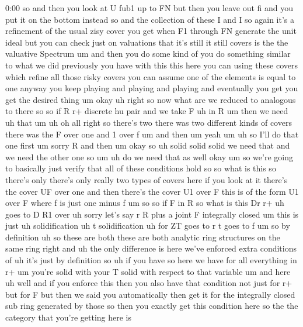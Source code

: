 \begin{unfinished}{0:00}
so  and  then  you  look  at  U  fub1  up  to  FN
but  then  you  leave  out  fi  and  you  put  it
on  the  bottom  instead  so  and  the
collection  of
these  I  and  I  so  again  it's  a  refinement
of  the  usual  zisy  cover  you  get  when  F1
through  FN  generate  the  unit  ideal  but
you  can  check  just  on  valuations  that
it's  still  it  still  covers  is  the  the
valuative  Spectrum  um  and  then  you  do
some  kind  of  you  do  something  similar  to
what  we  did  previously  you  have  with
this  this  here  you  can  using  these
covers  which  refine  all  those  risky
covers  you  can  assume  one  of  the
elements  is  equal  to  one  anyway  you  keep
playing  and  playing  and  playing  and
eventually  you  get  you  get  the  desired
thing  um
okay  uh  right  so  now  what  are  we  reduced
to  analogous  to  there
so  so  if  R  r+  discrete  hu
pair  and  we  take  F  uh  in
R  um  then  we  need  uh
that
um
uh
oh  all  right  so  there's  two  there  was
two  different  kinds  of  covers  there  was
the  F  over  one  and  1  over  f  um  and  then
um
yeah  um
uh  so  I'll  do  that  one
first  um  sorry  R  and
then
um  okay  so  uh  solid  solid
solid  we  need  that  and  we  need  the  other
one
so
um
uh  do  we  need  that  as
well
okay  um  so  we're  going  to  basically  just
verify  that  all  of  these  conditions  hold
so
so  what  is  this  so  there's  only  there's
only  really  two  types  of  covers  here  if
you  look  at  it  there's  the  cover  UF  over
one  and  then  there's  the  cover  U1  over  F
this  is  of  the  form  U1  over  F  where  f  is
just  one  minus  f  um  so  so  if  F  in
R  so  what  is  this  Dr
r+  uh  goes  to  D  R1  over  uh  sorry  let's
say  r  R  plus  a  joint  F  integrally
closed  um  this  is
just  uh
solidification  uh  t
solidification  uh  for  ZT  goes  to  r  t
goes  to
f
um  so  by
definition  uh  so  these  are  both  these
are  both  analytic  ring  structures  on  the
same  ring  right  and  uh  the  only
difference  is  here  we've  enforced  extra
conditions  of  uh  it's  just  by  definition
so  uh  if  you  have  so  here  we  have  for
all  everything  in  r+  um  you're  solid
with  your  T  solid  with  respect  to  that
variable  um  and  here  uh  well  and  if  you
enforce  this  then  you  also  have  that
condition  not  just  for  r+  but  for  F  but
then  we  said  you  automatically  then  get
it  for  the  integrally  closed  sub  ring
generated  by  those  so  then  you  exactly
get  this  condition  here  so  the  the
category  that  you're  getting  here  is

\end{unfinished}
